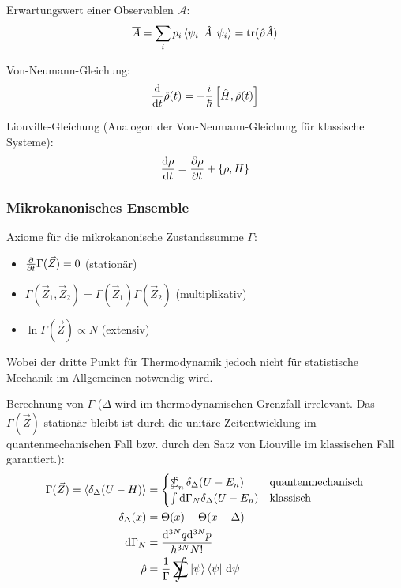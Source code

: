 \documentclass[11pt]{article}
\DeclareMathOperator*{\SumInt}{%
\mathchoice%
  {\ooalign{$\displaystyle\sum$\cr\hidewidth$\displaystyle\int$\hidewidth\cr}}
  {\ooalign{\raisebox{.14\height}{\scalebox{.7}{$\textstyle\sum$}}\cr\hidewidth$\textstyle\int$\hidewidth\cr}}
  {\ooalign{\raisebox{.2\height}{\scalebox{.6}{$\scriptstyle\sum$}}\cr$\scriptstyle\int$\cr}}
  {\ooalign{\raisebox{.2\height}{\scalebox{.6}{$\scriptstyle\sum$}}\cr$\scriptstyle\int$\cr}}
}
\numberwithin{equation}{section}
\begin{document}
				\noindent
				Erwartungswert einer Observablen $\mathcal{A}$:
				\begin{equation}
					\overline{A} = \sum_i p_i \Bra{\psi_i}\hat{A}\Ket{\psi_i} = \mathrm{tr} (\hat{\rho}\hat{A})
				\end{equation}

				\noindent
				Von-Neumann-Gleichung:
				\begin{equation}
					\frac{\mathrm{d} }{\mathrm{d} t}\hat{\rho}(t) = -\frac{i}{\hbar} \left[\hat{H},\hat{\rho}(t)\right]
				\end{equation}

				\noindent
				Liouville-Gleichung (Analogon der Von-Neumann-Gleichung für klassische Systeme):
				\begin{equation}
					\frac{\mathrm{d} \rho}{\mathrm{d} t} = \frac{\partial \rho}{\partial t}+\left\lbrace \rho,H \right\rbrace
				\end{equation}

			\subsubsection{Mikrokanonisches Ensemble}
				\noindent
				Axiome für die mikrokanonische Zustandssumme $\Gamma$:
				\begin{itemize}\itemsep -0pt	%
					\item $\frac{\partial }{\partial t}\Gamma(\vec{Z}) = 0$ \hfill{(stationär)}
					\item $\Gamma(\vec{Z}_1,\vec{Z}_2) = \Gamma(\vec{Z}_1)\Gamma(\vec{Z}_2) $ \hfill{(multiplikativ)}
					\item $\ln\Gamma(\vec{Z}) \propto N$ \hfill{(extensiv)}
				\end{itemize}
				Wobei der dritte Punkt für Thermodynamik jedoch nicht für statistische Mechanik im Allgemeinen notwendig wird.

				\noindent
				Berechnung von $\Gamma$ ($\Delta$ wird im thermodynamischen Grenzfall irrelevant. Das $\Gamma(\vec{Z})$ stationär bleibt ist durch die unitäre Zeitentwicklung im quantenmechanischen Fall bzw. durch den Satz von Liouville im klassischen Fall garantiert.):
				\begin{equation}
					\begin{aligned}
						\Gamma(\vec{Z}) = \langle \delta_\Delta (U-H) \rangle
							&= \begin{cases}
									\SumInt_n \delta_\Delta(U-E_n) & \text{quantenmechanisch} \\
									\int \diff \Gamma_N \delta_\Delta(U-E_n) & \text{klassisch}
								\end{cases} \\
						\delta_\Delta(x) &= \Theta(x) - \Theta(x-\Delta)\\
						\diff \Gamma_N &= \frac{\diff^{3N}q \diff^{3N}p }{h^{3N} N!} \\
						\hat{\rho} &= \frac{1}{\Gamma} \SumInt \Ket{\psi}\Bra{\psi}\,\diff\psi
					\end{aligned}
				\end{equation}
\end{document}
